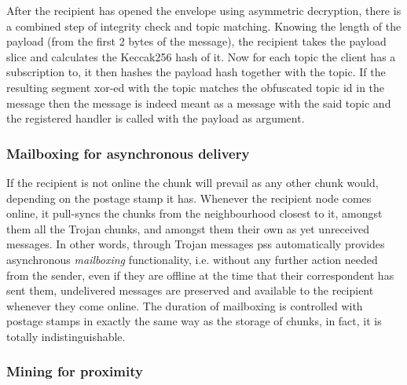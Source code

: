 After the recipient has opened the envelope using asymmetric decryption, there is a combined step of integrity check and topic matching. Knowing the length of the payload (from the first 2 bytes of the message), the recipient takes the payload slice and calculates the Keccak256 hash of it. Now for each topic the client has a subscription to, it then hashes the payload hash together with the topic. If the resulting segment xor-ed with the topic matches the obfuscated topic id in the message then the message is indeed meant as a message with the said topic and the registered handler is called with the payload as argument.

\subsubsection{Mailboxing for asynchronous delivery}

If the recipient is not online the chunk will prevail as any other chunk would, depending on the postage stamp it has. Whenever the recipient node comes online, it pull-syncs the chunks from the neighbourhood closest to it, amongst them all the Trojan chunks, and amongst them their own as yet unreceived messages. In other words, through Trojan messages pss automatically provides asynchronous \emph{mailboxing} functionality, i.e. 
without any further action needed from the sender, even if they are offline at the time that their correspondent has sent them, undelivered messages are preserved and available to the recipient whenever they come online. The duration of mailboxing is controlled with postage stamps in exactly the same way as the storage of chunks, in fact, it is totally indistinguishable.

\subsubsection{Mining for proximity}


